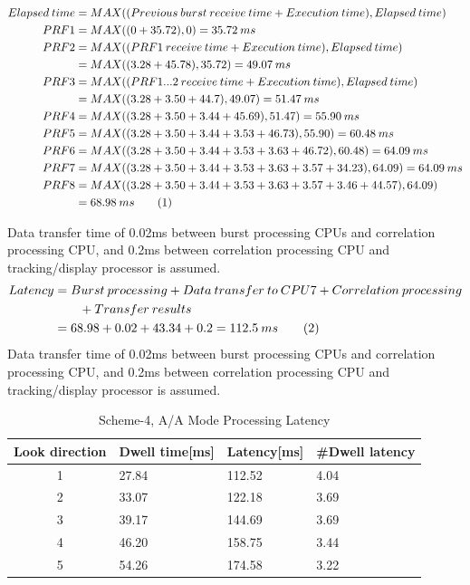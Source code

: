 \begin{align*}
	Elapsed \: time &= MAX((Previous \: burst \: receive \: time + Execution \: time), Elapsed \: time)\\
	PRF1 &= MAX((0 + 35.72), 0) = 35.72 \: ms\\
	PRF2 &= MAX((PRF1 \: receive \: time + Execution \: time), Elapsed \: time) \\
		&= MAX((3.28 + 45.78), 35.72) = 49.07 \: ms \\	 
	PRF3 &= MAX((PRF1...2 \: receive \: time + Execution \: time), Elapsed \: time) \\	
		&= MAX((3.28 + 3.50 + 44.7),49.07) = 51.47 \: ms \\
	PRF4 &= MAX((3.28 + 3.50 + 3.44 + 45.69), 51.47) = 55.90 \: ms \\
	PRF5 &= MAX((3.28 + 3.50 + 3.44 + 3.53 + 46.73), 55.90) = 60.48 \: ms \\
	PRF6 &= MAX((3.28 + 3.50 + 3.44 + 3.53 + 3.63 + 46.72), 60.48) = 64.09 \: ms \\ 
	PRF7 &= MAX((3.28 + 3.50 + 3.44 + 3.53 + 3.63 + 3.57 + 34.23), 64.09) = 64.09 \: ms \\	
	PRF8 &= MAX((3.28 + 3.50 + 3.44 + 3.53 + 3.63 + 3.57 + 3.46 + 44.57), 64.09) \\
		&= 68.98 \: ms	\stepcounter{equation}\tag{\theequation}
\end{align*}

Data transfer time of 0.02ms between burst processing CPUs and correlation processing CPU, and 0.2ms between correlation processing CPU and tracking/display processor is assumed.
\begin{align*}
	Latency &= Burst \: processing + Data \: transfer \: to \: CPU7 + Correlation \: processing \\
		& \qquad + Transfer \: results  \\
		&= 68.98 + 0.02 + 43.34 + 0.2 = 112.5 \: ms  \stepcounter{equation}\tag{\theequation}
\end{align*}
Data transfer time of 0.02ms between burst processing CPUs and correlation processing CPU, and 0.2ms between correlation processing CPU and tracking/display processor is assumed.
\begin{table}[h!]
	\centering
	\begin{tabular}{|c|l|l|l|} 
	 \hline
	 \textbf{Look direction} & \textbf{Dwell time[ms]} & \textbf{Latency[ms]} & \textbf{\#Dwell latency} \\
	 \hline
	 1 & 27.84 & 112.52 & 4.04 \\ \hline
	 2 & 33.07 & 122.18 & 3.69 \\ \hline
	 3 & 39.17 & 144.69 & 3.69 \\ \hline
	 4 & 46.20 & 158.75 & 3.44 \\ \hline
	 5 & 54.26 & 174.58 & 3.22 \\ \hline
	\end{tabular}
	\caption{Scheme-4, A/A Mode Processing Latency}
	\label{tbl:mm:scheme4_latency}
\end{table}

